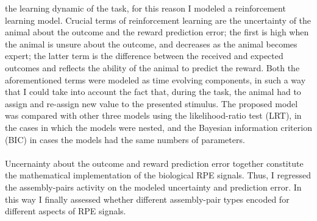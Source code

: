 the learning dynamic of the task, for this reason I modeled a reinforcement learning model. Crucial terms of reinforcement learning are the uncertainty of the animal about the outcome and the reward prediction error; the first is high when the animal is unsure about the outcome, and decreases as the animal becomes expert; the latter term is the difference between the received and expected outcomes and reflects the ability of the animal to predict the reward. Both the aforementioned terms were modeled as time evolving components, in such a way that I could take into account the fact that, during the task, the animal had to assign and re-assign new value to the presented stimulus. The proposed model was compared with other three models using the likelihood-ratio test (LRT), in the cases in which the models were nested, and the Bayesian information criterion (BIC) in cases the models had the same numbers of parameters.\\\\Uncernainty about the outcome and reward prediction error together constitute the mathematical implementation of the biological RPE signals. Thus, I regressed the assembly-pairs activity on the modeled uncertainty and prediction error. In this way I finally assessed whether different assembly-pair types encoded for different aspects of RPE signals.


